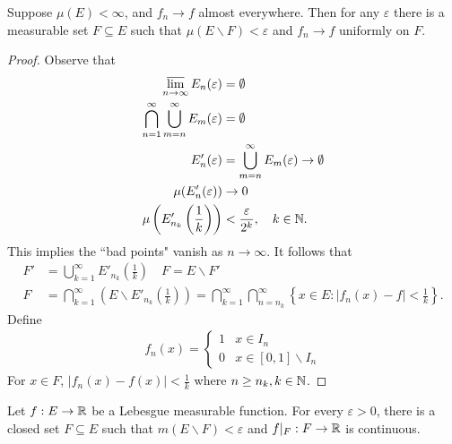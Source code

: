 \documentclass[class=book, crop=false]{standalone}
\begin{document}
        \begin{theorem}
            Suppose $\mu(E) < \infty$, and $f_n \rightarrow f$ almost everywhere. Then for any $\varepsilon$ there is a measurable set $F \subseteq E$ such that $\mu(E \backslash F) < \varepsilon$ and $f_n \rightarrow f$ uniformly on $F$.
        \end{theorem}
        \begin{proof}
            Observe that
            \begin{align*}
                \varlimsup_{n \rightarrow \infty} E_n(\varepsilon) &= \emptyset \\
                \bigcap^{\infty}_{n = 1} \bigcup^{\infty}_{m = n} E_m(\varepsilon) &= \emptyset \\
                E'_n(\varepsilon) &= \bigcup^{\infty}_{m = n} E_m(\varepsilon) \rightarrow \emptyset \\
                \mu(E'_n(\varepsilon)) &\rightarrow 0 \\
                \mu\left(E'_{n_k}\left(\frac{1}{k}\right)\right) &< \frac{\varepsilon}{2^k}, \quad k \in \mathbb{N}.
            \end{align*}
            This implies the ``bad points" vanish as $n \rightarrow \infty$. It follows that
            \begin{align*}
                F' &= \bigcup^{\infty}_{k = 1} E'_{n_k}\left(\frac{1}{k}\right) \quad F = E \backslash F' \\
                F &= \bigcap^{\infty}_{k = 1} \left(E \backslash E'_{n_k}\left(\frac{1}{k}\right)\right) = \bigcap^{\infty}_{k = 1} \bigcap^{\infty}_{n = n_k} \left\{x \in E : |f_n(x) - f| < \frac{1}{k}\right\}.
            \end{align*}
            Define
            \begin{align*}
                f_n(x) = \begin{cases}
                    1 & x \in I_n \\
                    0 & x \in [0, 1] \backslash I_n
                \end{cases}
            \end{align*}
            For $x \in F$, $|f_n(x) - f(x)| < \frac{1}{k}$ where $n \geq n_k, k \in \mathbb{N}$.
        \end{proof}

        \begin{theorem}
            Let $f : E \rightarrow \mathbb{R}$ be a Lebesgue measurable function. For every $\varepsilon > 0$, there is a closed set $F \subseteq E$ such that $m(E \backslash F) < \varepsilon$ and $f|_F : F \rightarrow \mathbb{R}$ is continuous.
        \end{theorem}
\end{document}

